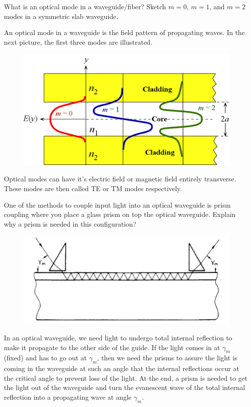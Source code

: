 \documentclass[answers, addpoints]{exam} %
\begin{document}
\begin{questions}
\begin{parts}
  \end{parts}

	\question[5] What is an optical mode in a waveguide/fiber? Sketch $m=0$, $m=1$, and $m=2$ modes in a symmetric slab waveguide.
	\begin{solution}
		An optical mode in a waveguide is the field pattern of propagating waves.
		In the next picture, the first three modes are illustrated.
		\begin{figure}[H]
			\centering
			\includegraphics[scale=.5]{figures/wgmodes}
		\end{figure}
		Optical modes can have it's electric field or magnetic field entirely transverse.
		These modes are then called TE or TM modes respectively.
	\end{solution}

	\question[5] One of the methods to couple input light into an optical waveguide is prism coupling where you place a glass prism on top the optical waveguide. Explain why a prism is needed in this configuration?
	\begin{figure}[H]
		\centering
		\includegraphics[scale=1]{figures/prismcoupling}
	\end{figure}
	\begin{solution}
		In an optical waveguide, we need light to undergo total internal reflection to make it propagate to the other side of the guide.
		If the light comes in at $\gamma_m$ (fixed) and has to go out at $\gamma_m$, then we need the prisms to assure the light is coming in the waveguide at such an angle that the internal reflections occur at the critical angle to prevent loss of the light.
		At the end, a prism is needed to get the light out of the waveguide and turn the evanescent wave of the total internal reflection into a propagating wave at angle $\gamma_m$.
		

\end{solution}
\end{questions}
\end{document}
